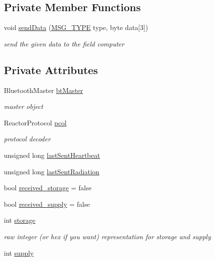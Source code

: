 \subsection*{Private Member Functions}
\begin{DoxyCompactItemize}
\item 
void \hyperlink{classBTClient_a0561b17912b37892d4f4226d1769f7e8}{send\-Data} (\hyperlink{classBTClient_aa4e607f3ba1fea67548e2c2864915cb8}{M\-S\-G\-\_\-\-T\-Y\-P\-E} type, byte data\mbox{[}3\mbox{]})
\begin{DoxyCompactList}\small\item\em send the given data to the field computer \end{DoxyCompactList}\end{DoxyCompactItemize}
\subsection*{Private Attributes}
\begin{DoxyCompactItemize}
\item 
Bluetooth\-Master \hyperlink{classBTClient_a5376be2a850c64faab1e9a02adcd342b}{bt\-Master}
\begin{DoxyCompactList}\small\item\em master object \end{DoxyCompactList}\item 
Reactor\-Protocol \hyperlink{classBTClient_a64bd4b5e464d0b6a57957428ef559142}{pcol}
\begin{DoxyCompactList}\small\item\em protocol decoder \end{DoxyCompactList}\item 
unsigned long \hyperlink{classBTClient_a43d60a64f08c8f4f8f384fc03444d643}{last\-Sent\-Heartbeat}
\item 
unsigned long \hyperlink{classBTClient_a905901f9d8ca2a1ac3f63b1cd1ec6151}{last\-Sent\-Radiation}
\item 
bool \hyperlink{classBTClient_a41a7d3382ab8bbdf4b7d78b7b69ff85f}{received\-\_\-storage} = false
\item 
bool \hyperlink{classBTClient_af00b18b695ecc4bdeea133572eb0fd6d}{received\-\_\-supply} = false
\item 
int \hyperlink{classBTClient_a5ba419e7e6be73f5ec26f6b6c8d4ccf1}{storage}
\begin{DoxyCompactList}\small\item\em raw integer (or hex if you want) representation for storage and supply \end{DoxyCompactList}\item 
int \hyperlink{classBTClient_a3974a28859432eeef27cfd7391ed7d60}{supply}
\end{DoxyCompactItemize}
